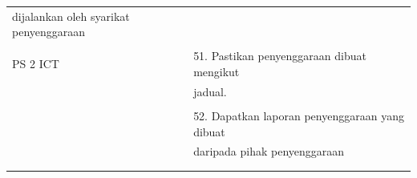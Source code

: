 \documentclass[
]{article}
\begin{document}
\begin{longtable}[]{@{}ll@{}}
\begin{minipage}[t]{0.71\columnwidth}
dijalankan oleh syarikat penyenggaraan\strut
\end{minipage}\tabularnewline
\begin{minipage}[t]{0.23\columnwidth}\raggedright
\strut
\end{minipage} & \begin{minipage}[t]{0.71\columnwidth}\raggedright
\strut
\end{minipage}\tabularnewline
\begin{minipage}[t]{0.23\columnwidth}\raggedright
PS 2 ICT\strut
\end{minipage} & \begin{minipage}[t]{0.71\columnwidth}\raggedright
51. Pastikan penyenggaraan dibuat mengikut\strut
\end{minipage}\tabularnewline
\begin{minipage}[t]{0.23\columnwidth}\raggedright
\strut
\end{minipage} & \begin{minipage}[t]{0.71\columnwidth}\raggedright
jadual.\strut
\end{minipage}\tabularnewline
\begin{minipage}[t]{0.23\columnwidth}\raggedright
\strut
\end{minipage} & \begin{minipage}[t]{0.71\columnwidth}\raggedright
\strut
\end{minipage}\tabularnewline
\begin{minipage}[t]{0.23\columnwidth}\raggedright
\strut
\end{minipage} & \begin{minipage}[t]{0.71\columnwidth}\raggedright
52. Dapatkan laporan penyenggaraan yang dibuat\strut
\end{minipage}\tabularnewline
\begin{minipage}[t]{0.23\columnwidth}\raggedright
\strut
\end{minipage} & \begin{minipage}[t]{0.71\columnwidth}\raggedright
daripada pihak penyenggaraan\strut
\end{minipage}\tabularnewline
\begin{minipage}[t]{0.23\columnwidth}\raggedright
\strut
\end{minipage} & \begin{minipage}[t]{0.71\columnwidth}\raggedright
\strut
\end{minipage}\tabularnewline
\begin{minipage}[t]{0.23\columnwidth}\raggedright
\strut
\end{minipage} & \begin{minipage}[t]{0.71\columnwidth}\raggedright

\end{minipage}
\end{longtable}
\end{document}
